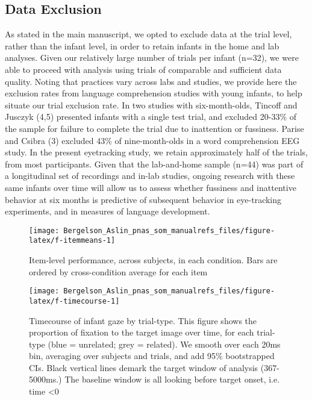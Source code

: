 \documentclass[]{article}
\begin{document}
\subsection{Data Exclusion}\label{data-exclusion}

As stated in the main manuscript, we opted to exclude data at the trial
level, rather than the infant level, in order to retain infants in the
home and lab analyses. Given our relatively large number of trials per
infant (n=32), we were able to proceed with analysis using trials of
comparable and sufficient data quality. Noting that practices vary
across labs and studies, we provide here the exclusion rates from
language comprehension studies with young infants, to help situate our
trial exclusion rate. In two studies with six-month-olds, Tincoff and
Jusczyk (4,5) presented infants with a single test trial, and excluded
20-33\% of the sample for failure to complete the trial due to
inattention or fussiness. Parise and Csibra (3) excluded 43\% of
nine-month-olds in a word comprehension EEG study. In the present
eyetracking study, we retain approximately half of the trials, from most
participants. Given that the lab-and-home sample (n=44) was part of a
longitudinal set of recordings and in-lab studies, ongoing research with
these same infants over time will allow us to assess whether fussiness
and inattentive behavior at six months is predictive of subsequent
behavior in eye-tracking experiments, and in measures of language
development.

\begin{figure}
\texttt{[image: Bergelson\_Aslin\_pnas\_som\_manualrefs\_files/figure-latex/f-itemmeans-1]} \def\figurename{Figure S\hskip-\the\fontdimen2\font\space }\caption{\label{fig:f-itemmeans}Item-level performance, across subjects, in each condition. Bars are ordered by cross-condition average for each item}\label{fig:f-itemmeans}
\end{figure}

\begin{figure}
\texttt{[image: Bergelson\_Aslin\_pnas\_som\_manualrefs\_files/figure-latex/f-timecourse-1]} \def\figurename{Figure S\hskip-\the\fontdimen2\font\space }\caption{\label{fig:f-timecourse}Timecourse of infant gaze by trial-type. This figure shows the proportion of fixation to the target image over time, for each trial-type (blue = unrelated; grey = related). We smooth over each 20ms bin, averaging over subjects and trials, and add 95\% bootstrapped CIs. Black vertical lines demark the target window of analysis (367-5000ms.) The baseline window is all looking before target onset, i.e. time <0}\label{fig:f-timecourse}
\end{figure}
\end{document}
